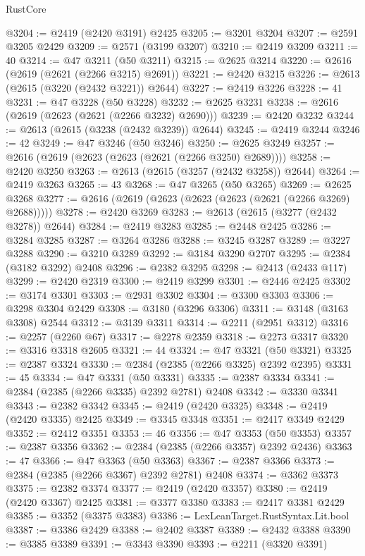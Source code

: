 \begin{lexlean}{RustCore}
\begin{coremodule}
@3204 := @2419 (@2420 @3191) @2425
@3205 := @3201 @3204
@3207 := @2591 @3205 @2429
@3209 := @2571 (@3199 @3207)
@3210 := @2419 @3209
@3211 := 40
@3214 := @47 @3211 (@50 @3211)
@3215 := @2625 @3214
@3220 := @2616 (@2619 (@2621 (@2266 @3215) @2691))
@3221 := @2420 @3215
@3226 := @2613 (@2615 (@3220 (@2432 @3221)) @2644)
@3227 := @2419 @3226
@3228 := 41
@3231 := @47 @3228 (@50 @3228)
@3232 := @2625 @3231
@3238 := @2616 (@2619 (@2623 (@2621 (@2266 @3232) @2690)))
@3239 := @2420 @3232
@3244 := @2613 (@2615 (@3238 (@2432 @3239)) @2644)
@3245 := @2419 @3244
@3246 := 42
@3249 := @47 @3246 (@50 @3246)
@3250 := @2625 @3249
@3257 := @2616 (@2619 (@2623 (@2623 (@2621 (@2266 @3250) @2689))))
@3258 := @2420 @3250
@3263 := @2613 (@2615 (@3257 (@2432 @3258)) @2644)
@3264 := @2419 @3263
@3265 := 43
@3268 := @47 @3265 (@50 @3265)
@3269 := @2625 @3268
@3277 := @2616 (@2619 (@2623 (@2623 (@2623 (@2621 (@2266 @3269) @2688)))))
@3278 := @2420 @3269
@3283 := @2613 (@2615 (@3277 (@2432 @3278)) @2644)
@3284 := @2419 @3283
@3285 := @2448 @2425
@3286 := @3284 @3285
@3287 := @3264 @3286
@3288 := @3245 @3287
@3289 := @3227 @3288
@3290 := @3210 @3289
@3292 := @3184 @3290 @2707
@3295 := @2384 (@3182 @3292) @2408
@3296 := @2382 @3295
@3298 := @2413 (@2433 @117)
@3299 := @2420 @2319
@3300 := @2419 @3299
@3301 := @2446 @2425
@3302 := @3174 @3301
@3303 := @2931 @3302
@3304 := @3300 @3303
@3306 := @3298 @3304 @2429
@3308 := @3180 (@3296 @3306)
@3311 := @3148 (@3163 @3308) @2544
@3312 := @3139 @3311
@3314 := @2211 (@2951 @3312)
@3316 := @2257 (@2260 @67)
@3317 := @2278 @2359
@3318 := @2273 @3317
@3320 := @3316 @3318 @2605
@3321 := 44
@3324 := @47 @3321 (@50 @3321)
@3325 := @2387 @3324
@3330 := @2384 (@2385 (@2266 @3325) @2392 @2395)
@3331 := 45
@3334 := @47 @3331 (@50 @3331)
@3335 := @2387 @3334
@3341 := @2384 (@2385 (@2266 @3335) @2392 @2781) @2408
@3342 := @3330 @3341
@3343 := @2382 @3342
@3345 := @2419 (@2420 @3325)
@3348 := @2419 (@2420 @3335) @2425
@3349 := @3345 @3348
@3351 := @2417 @3349 @2429
@3352 := @2412 @3351
@3353 := 46
@3356 := @47 @3353 (@50 @3353)
@3357 := @2387 @3356
@3362 := @2384 (@2385 (@2266 @3357) @2392 @2436)
@3363 := 47
@3366 := @47 @3363 (@50 @3363)
@3367 := @2387 @3366
@3373 := @2384 (@2385 (@2266 @3367) @2392 @2781) @2408
@3374 := @3362 @3373
@3375 := @2382 @3374
@3377 := @2419 (@2420 @3357)
@3380 := @2419 (@2420 @3367) @2425
@3381 := @3377 @3380
@3383 := @2417 @3381 @2429
@3385 := @3352 (@3375 @3383)
@3386 := LexLeanTarget.RustSyntax.Lit.bool
@3387 := @3386 @2429
@3388 := @2402 @3387
@3389 := @2432 @3388
@3390 := @3385 @3389
@3391 := @3343 @3390
@3393 := @2211 (@3320 @3391)

\end{coremodule}
\end{lexlean}
